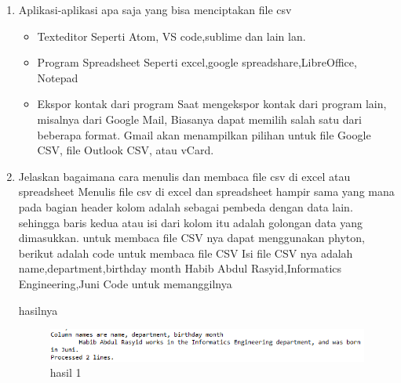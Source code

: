 \begin {enumerate}
\item Aplikasi-aplikasi apa saja yang bisa menciptakan file csv
\begin{itemize}
	\item Texteditor
	Seperti Atom, VS code,sublime dan lain lan.
	\item Program Spreadsheet
	Seperti excel,google spreadshare,LibreOffice, Notepad
	\item Ekspor kontak dari program
	Saat mengekspor kontak dari program lain, misalnya dari Google Mail, Biasanya dapat memilih salah satu dari beberapa format.
	Gmail akan menampilkan pilihan untuk file Google CSV, file Outlook CSV, atau vCard.
\end{itemize}
\item Jelaskan bagaimana cara menulis dan membaca file csv di excel atau spreadsheet
Menulis file csv di excel dan spreadsheet hampir sama yang mana pada bagian header kolom adalah sebagai pembeda dengan data lain.
sehingga baris kedua atau isi dari kolom itu adalah golongan data yang dimasukkan.
untuk membaca file CSV nya dapat menggunakan phyton, berikut adalah code untuk membaca file CSV
Isi file CSV nya adalah
name,department,birthday month
Habib Abdul Rasyid,Informatics Engineering,Juni
Code untuk memanggilnya

hasilnya

\begin{figure}[h]
\centering
\includegraphics[scale=0.5]{figures/habib/hasil1.png}
\caption{hasil 1}
\label{fig:csv}
\end{figure}


\end{enumerate}
